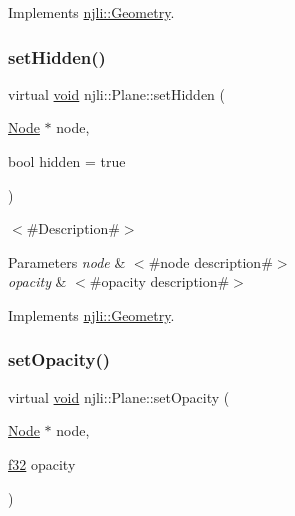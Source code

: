 Implements \mbox{\hyperlink{classnjli_1_1_geometry_a6ba967a65603a7660ab63fe067e338b4}{njli\+::\+Geometry}}.

\mbox{\label{classnjli_1_1_plane_af6ce772f6604982a03f837f9479e590b}} 
\subsubsection{\texorpdfstring{set\+Hidden()}{setHidden()}}
{\footnotesize\ttfamily virtual \mbox{\hyperlink{_thread_8h_af1e856da2e658414cb2456cb6f7ebc66}{void}} njli\+::\+Plane\+::set\+Hidden (\begin{DoxyParamCaption}\item[{\mbox{\hyperlink{classnjli_1_1_node}{Node}} $\ast$}]{node,  }\item[{bool}]{hidden = {\ttfamily true} }\end{DoxyParamCaption})\hspace{0.3cm}{\ttfamily [virtual]}}

$<$\#\+Description\#$>$


\begin{DoxyParams}{Parameters}
{\em node} & $<$\#node description\#$>$ \\
\hline
{\em opacity} & $<$\#opacity description\#$>$ \\
\hline
\end{DoxyParams}


Implements \mbox{\hyperlink{classnjli_1_1_geometry_a4ba0fc9934e40c651b89969d47b03d3b}{njli\+::\+Geometry}}.

\mbox{\label{classnjli_1_1_plane_abf634e87fdc57ec8a9a2965ec24cc34f}} 
\subsubsection{\texorpdfstring{set\+Opacity()}{setOpacity()}}
{\footnotesize\ttfamily virtual \mbox{\hyperlink{_thread_8h_af1e856da2e658414cb2456cb6f7ebc66}{void}} njli\+::\+Plane\+::set\+Opacity (\begin{DoxyParamCaption}\item[{\mbox{\hyperlink{classnjli_1_1_node}{Node}} $\ast$}]{node,  }\item[{\mbox{\hyperlink{_util_8h_a5f6906312a689f27d70e9d086649d3fd}{f32}}}]{opacity }\end{DoxyParamCaption})\hspace{0.3cm}{\ttfamily [virtual]}}

